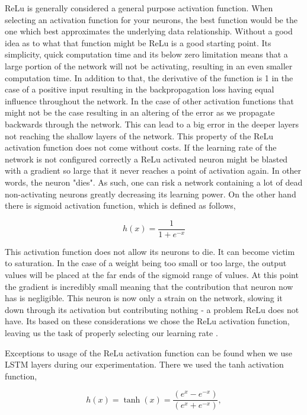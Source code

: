 \gls{ReLu} is generally considered a general purpose activation function. When
selecting an activation function for your neurons, the best function would be
the one which best approximates the underlying data relationship. Without a good
idea as to what that function might be \gls{ReLu} is a good starting point. Its
simplicity, quick computation time and its below zero limitation means that
a large portion of the network will not be activating, resulting in an even
smaller computation time. In addition to that, the derivative of the function
is 1 in the case of a positive input resulting in the backpropagation loss
having equal influence throughout the network. In the case of other activation
functions that might not be the case resulting in an altering of the error as
we propagate backwards through the network. This can lead to a big error in the
deeper layers not reaching the shallow layers of the network. This property of
the \gls{ReLu} activation function does not come without costs. If the learning
rate of the network is not configured correctly a \gls{ReLu} activated neuron
might be blasted with a gradient so large that it never reaches a point of
activation again. In other words, the neuron "dies". As such, one can risk a
network containing a lot of dead non-activating neurons greatly decreasing its
learning power. On the other hand there is sigmoid activation function,
which is defined as follows, 

\begin{equation}
    h(x) = \frac{1}{1 + e^{-x}}
\end{equation}

This activation function does not allow its neurons to die. It can become
victim to saturation. In the case of a weight being too small or too large, the
output values will be placed at the far ends of the sigmoid range of values.
At this point the gradient is incredibly small meaning that the contribution
that neuron now has is negligible. This neuron is now only a strain on the
network, slowing it down through its activation but contributing nothing - a
problem \gls{ReLu} does not have. Its based on these considerations we chose the
\gls{ReLu} activation function, leaving us the task of properly selecting our
learning rate \citep{JiYan, AndrejKarpathy, AvinashSharmaV}.

Exceptions to usage of the \gls{ReLu} activation function can be found when
we use \gls{LSTM} layers during our experimentation. There we used the tanh
activation function,

\begin{equation}\label{eq:tanh}
    h(x) = \tanh(x) = \frac{(e^x - e^{-x})}{(e^x + e^{-x})},
\end{equation}


